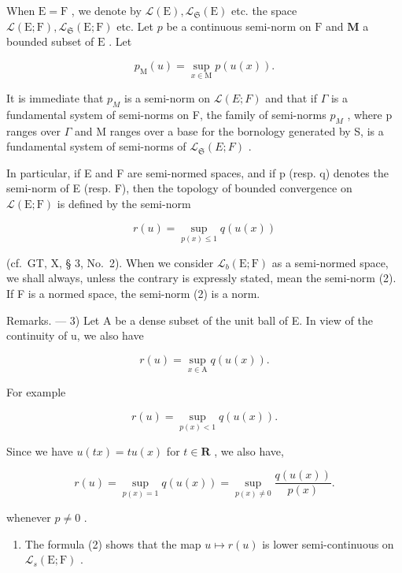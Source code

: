 When \(\mathrm{E} = \mathrm{F}\) , we denote by \(\mathcal{L}(\mathrm{E}), \mathcal{L}_{\mathfrak{S}}(\mathrm{E})\) etc. the space \(\mathcal{L}(\mathrm{E};\mathrm{F}), \mathcal{L}_{\mathfrak{S}}(\mathrm{E};\mathrm{F})\) etc. Let \(p\) be a continuous semi-norm on \(\mathrm{F}\) and \(\mathbf{M}\) a bounded subset of \(\mathrm{E}\) . Let

\[
p _ {\mathrm{M}} (u) = \sup _ {x \in \mathrm{M}} p (u (x)).\tag{1}
\]

It is immediate that \(p_{M}\) is a semi-norm on \(\mathcal{L}(E;F)\) and that if \(\Gamma\) is a fundamental system of semi-norms on F, the family of semi-norms \(p_{M}\) , where p ranges over \(\Gamma\) and M ranges over a base for the bornology generated by S, is a fundamental system of semi-norms of \(\mathcal{L}_{\mathfrak{S}}(E;F)\) .

In particular, if E and F are semi-normed spaces, and if p (resp. q) denotes the semi-norm of E (resp. F), then the topology of bounded convergence on \(\mathcal{L}(\mathrm{E};\mathrm{F})\) is defined by the semi-norm

\[
r (u) = \sup _ {p (x) \leqslant 1} q (u (x))\tag{2}
\]

(cf.~GT, X, § 3, No.~2). When we consider \(\mathcal{L}_b(\mathrm{E};\mathrm{F})\) as a semi-normed space, we shall always, unless the contrary is expressly stated, mean the semi-norm (2). If F is a normed space, the semi-norm (2) is a norm.

Remarks. --- 3) Let A be a dense subset of the unit ball of E. In view of the continuity of u, we also have

\[
r (u) = \sup _ {x \in \mathrm{A}} q (u (x)).\tag{3}
\]

For example

\[
r (u) = \sup _ {p (x) <   1} q (u (x)).\tag{4}
\]

Since we have \(u(tx) = tu(x)\) for \(t \in \mathbf{R}\) , we also have,

\[
r (u) = \sup _ {p (x) = 1} q (u (x)) = \sup _ {p (x) \neq 0} \frac {q (u (x))}{p (x)}.\tag{5}
\]

whenever \(p \neq 0\) .

\begin{enumerate}
\def\labelenumi{\arabic{enumi})}
\setcounter{enumi}{3}
\tightlist
\item
  The formula (2) shows that the map \(u \mapsto r(u)\) is lower semi-continuous on \(\mathcal{L}_s(\mathrm{E};\mathrm{F})\) .
\end{enumerate}


